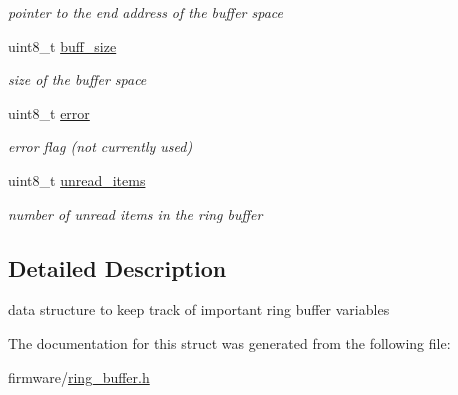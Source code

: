 \begin{DoxyCompactItemize}
\begin{DoxyCompactList}\small\item\em pointer to the end address of the buffer space \end{DoxyCompactList}\item 
\hypertarget{structring__buffer__t_a1c49e6fd87f7189eca59069e8ccad511}{}\label{structring__buffer__t_a1c49e6fd87f7189eca59069e8ccad511} 
uint8\+\_\+t \hyperlink{structring__buffer__t_a1c49e6fd87f7189eca59069e8ccad511}{buff\+\_\+size}
\begin{DoxyCompactList}\small\item\em size of the buffer space \end{DoxyCompactList}\item 
\hypertarget{structring__buffer__t_a81fff9486477aa8dc8d8e586ab55f479}{}\label{structring__buffer__t_a81fff9486477aa8dc8d8e586ab55f479} 
uint8\+\_\+t \hyperlink{structring__buffer__t_a81fff9486477aa8dc8d8e586ab55f479}{error}
\begin{DoxyCompactList}\small\item\em error flag (not currently used) \end{DoxyCompactList}\item 
\hypertarget{structring__buffer__t_a6cad7a628d441b7e64587e6d3807ce9e}{}\label{structring__buffer__t_a6cad7a628d441b7e64587e6d3807ce9e} 
uint8\+\_\+t \hyperlink{structring__buffer__t_a6cad7a628d441b7e64587e6d3807ce9e}{unread\+\_\+items}
\begin{DoxyCompactList}\small\item\em number of unread items in the ring buffer \end{DoxyCompactList}\end{DoxyCompactItemize}


\subsection{Detailed Description}
data structure to keep track of important ring buffer variables 

The documentation for this struct was generated from the following file\+:\begin{DoxyCompactItemize}
\item 
firmware/\hyperlink{ring__buffer_8h}{ring\+\_\+buffer.\+h}\end{DoxyCompactItemize}
